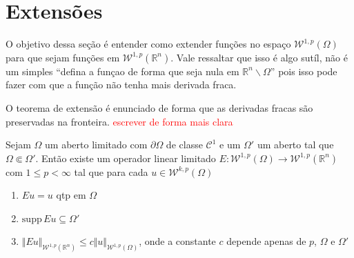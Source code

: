 \documentclass[a4paper, 11pt]{book}
\theoremstyle{definition}
\newcommand{\bR}{\mathbb{R}}
\newcommand{\cC}{\mathcal{C}}
\newcommand{\cW}{\mathcal{W}}
\newcommand{\supp}{\mathrm{supp}\,}
\begin{document}
\section{Extensões}

O objetivo dessa seção é entender como extender funções no espaço $\cW^{1,p}(\Omega)$ para que sejam funções em $\cW^{1,p}(\bR^n)$. 
Vale ressaltar que isso é algo sutíl, não é um simples ``defina a funçao de forma que seja nula em $\bR^n \smallsetminus \Omega$'' pois isso pode fazer com que a função não tenha mais derivada fraca.

O teorema de extensão é enunciado de forma que as derivadas fracas são preservadas na fronteira. \textcolor{red}{escrever de forma mais clara}

\begin{tbox} \label{thm:extensao}
    Sejam $\Omega$ um aberto limitado com $\partial\Omega$ de classe $\cC^1$ e um $\Omega'$ um aberto tal que $\Omega \Subset \Omega'$. Então existe um operador linear limitado $E : \cW^{1,p}(\Omega) \to \cW^{1,p}(\bR ^n)$ com $1 \leqslant p < \infty$ tal que para cada $u \in \cW^{k,p}(\Omega)$
    \begin{enumerate}[leftmargin=*, label=\textbf{(\alph*)}]
        \item $Eu = u$ qtp em $\Omega$
        \item $\supp Eu \subseteq \Omega'$
        \item $\Vert Eu \Vert_{\cW^{1,p}(\bR^n)} \leqslant c \Vert u \Vert_{\cW^{1,p}(\Omega)}$, onde a constante $c$ depende apenas de $p$, $\Omega$ e $\Omega'$
    \end{enumerate}
\end{tbox}
\end{document}
